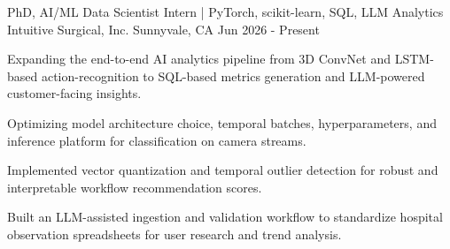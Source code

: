 \documentclass[11pt, a4paper]{awesome-cv}
\begin{document}
\begin{cventries}
  
  \cventry
    {PhD, AI/ML Data Scientist Intern | PyTorch, scikit-learn, SQL, LLM Analytics}
    {Intuitive Surgical, Inc.}
    {Sunnyvale, CA}
    {Jun 2026 - Present}
    {
      \begin{cvitems}
        \item {Expanding the end-to-end AI analytics pipeline from 3D ConvNet and LSTM-based action-recognition to SQL-based metrics generation and LLM-powered customer-facing insights.}
        \item {Optimizing model architecture choice, temporal batches, hyperparameters, and inference platform for classification on camera streams.}
        \item {Implemented vector quantization and temporal outlier detection for robust and interpretable workflow recommendation scores.}
        \item {Built an LLM-assisted ingestion and validation workflow to standardize hospital observation spreadsheets for user research and trend analysis.}
      \end{cvitems}
    }


\end{cventries}
\end{document}
